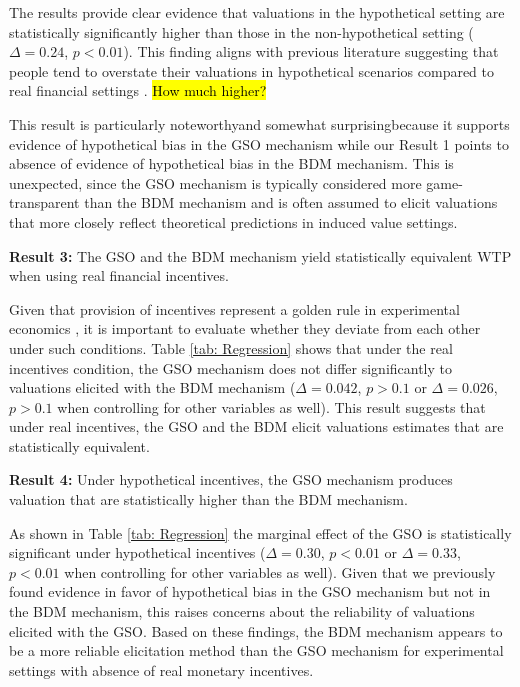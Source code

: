 \documentclass[12pt]{article}
\begin{document}
The results provide clear evidence that valuations in the hypothetical setting are statistically significantly higher than those in the non-hypothetical setting (\(\Delta = 0.24\), \(p < 0.01\)). This finding aligns with previous literature suggesting that people tend to overstate their valuations in hypothetical scenarios compared to real financial settings \citep{penn2018understanding, fang_use_2021}. \hl{How much higher?}

This result is particularly noteworthy\textemdash and somewhat surprising\textemdash because it supports evidence of hypothetical bias in the GSO mechanism while our Result 1 points to absence of evidence of hypothetical bias  in the BDM mechanism. This is unexpected, since the GSO mechanism is typically considered more game-transparent than the BDM mechanism and is often assumed to elicit valuations that more closely reflect theoretical predictions in induced value settings. 

\vspace{0.5cm}



\textbf{Result 3:} The GSO and the BDM mechanism yield statistically equivalent WTP when using real financial incentives. 

Given that provision of incentives represent a golden rule in experimental economics \citep{smith_experimental_1976}, it is important to evaluate whether they deviate from each other under such conditions. Table \ref{tab: Regression} shows that under the real incentives condition, the GSO mechanism does not differ significantly to valuations elicited with the BDM mechanism (\(\Delta = 0.042\), \(p > 0.1\) or \(\Delta = 0.026\), \(p > 0.1\) when controlling for other variables as well). This result suggests that under real incentives, the GSO and the BDM elicit valuations estimates that are statistically equivalent.

\vspace{0.5cm}

\textbf{Result 4:} Under hypothetical incentives, the GSO mechanism produces valuation that are statistically higher than the BDM mechanism.

As shown in Table \ref{tab: Regression} the marginal effect of the GSO is statistically significant under hypothetical incentives  (\(\Delta = 0.30\), \(p < 0.01\) or \(\Delta = 0.33\), \(p < 0.01\) when controlling for other variables as well). Given that we previously found evidence in favor of hypothetical bias in the GSO mechanism but not in the BDM mechanism, this raises concerns about the reliability of valuations elicited with the GSO. Based on these findings, the BDM mechanism appears to be a more reliable elicitation method than the GSO mechanism for experimental settings with absence of real monetary incentives.
\end{document}
